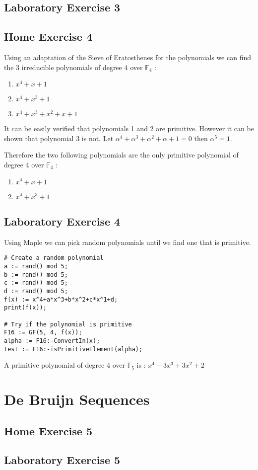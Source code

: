 \documentclass{article}
\begin{document}
\subsection{Laboratory Exercise 3}


\subsection{Home Exercise 4}

Using an adaptation of the Sieve of Eratosthenes for the polynomials we can find the 3 irreducible polynomials of degree 4 over $\mathbb{F}_4$ :
\begin{enumerate}
    \item $x^4+x+1$
    \item $x^4+x^3+1$
    \item $x^4+x^3+x^2+x+1$
\end{enumerate}

It can be easily verified that polynomials 1 and 2 are primitive. However it can be shown that polynomial 3 is not. Let $\alpha^4+\alpha^3+\alpha^2+\alpha+1 = 0$ then $\alpha^5=1$. \newline

Therefore the two following polynomials are the only primitive polynomial of degree 4 over $\mathbb{F}_4$ :
\begin{enumerate}
    \item $x^4+x+1$
    \item $x^4+x^3+1$
\end{enumerate}

\subsection{Laboratory Exercise 4}

Using Maple we can pick random polynomials until we find one that is primitive.
\begin{verbatim}
# Create a random polynomial
a := rand() mod 5;
b := rand() mod 5;
c := rand() mod 5;
d := rand() mod 5;
f(x) := x^4+a*x^3+b*x^2+c*x^1+d;
print(f(x));

# Try if the polynomial is primitive
F16 := GF(5, 4, f(x));
alpha := F16:-ConvertIn(x);	
test := F16:-isPrimitiveElement(alpha);
\end{verbatim}

A primitive polynomial of degree 4 over $\mathbb{F}_5$ is : $x^4+3x^3+3x^2+2$


\section{De Bruijn Sequences}

\subsection{Home Exercise 5}
\subsection{Laboratory Exercise 5}
\end{document}
